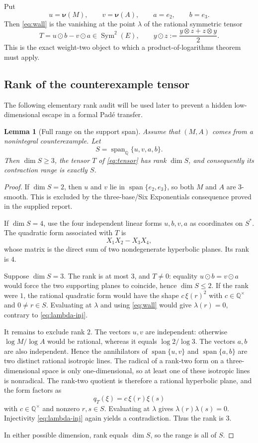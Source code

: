 \documentclass[11pt]{article}
\newtheorem{lemma}[theorem]{Lemma}
\theoremstyle{definition}
\newcommand{\Q}{\mathbb Q}
\newcommand{\Span}{\operatorname{span}}
\newcommand{\val}{\boldsymbol\nu}
\newcommand{\odotQ}{\mathbin{\odot}}
\begin{document}
Put
\[
  u=\val(M),\qquad v=\val(A),\qquad a=e_2,\qquad b=e_3.
\]
Then \eqref{eq:wall} is the vanishing at the point $\lambda$ of the rational symmetric tensor
\begin{equation}\label{eq:tensor}
  T=u\odotQ b-v\odotQ a\in\operatorname{Sym}^2(E),
  \qquad y\odotQ z:=\frac{y\otimes z+z\otimes y}{2}.
\end{equation}
This is the exact weight-two object to which a product-of-logarithms theorem must apply.

\subsection{Rank of the counterexample tensor}

The following elementary rank audit will be used later to prevent a hidden low-dimensional
escape in a formal Pad\'e transfer.

\begin{lemma}[Full range on the support span]\label{lem:tensor-rank}
Assume that $(M,A)$ comes from a nonintegral counterexample.  Let
\[
  S=\Span_\Q\{u,v,a,b\}.
\]
Then $\dim S\ge3$, the tensor $T$ of \eqref{eq:tensor} has rank $\dim S$, and consequently
its contraction range is exactly $S$.
\end{lemma}

\begin{proof}
If $\dim S=2$, then $u$ and $v$ lie in $\Span\{e_2,e_3\}$, so both $M$ and $A$ are
$3$-smooth.  This is excluded by the three-base/Six Exponentials consequence proved in the
supplied report.

If $\dim S=4$, use the four independent linear forms $u,b,v,a$ as coordinates on $S^*$.
The quadratic form associated with $T$ is
\[
  X_1X_2-X_3X_4,
\]
whose matrix is the direct sum of two nondegenerate hyperbolic planes.  Its rank is $4$.

Suppose $\dim S=3$.  The rank is at most $3$, and $T\ne0$: equality $u\odotQ b=v\odotQ a$
would force the two supporting planes to coincide, hence $\dim S\le2$.  If the rank were $1$,
the rational quadratic form would have the shape $c\,\xi(r)^2$ with $c\in\Q^\times$ and
$0\ne r\in S$.  Evaluating at $\lambda$ and using \eqref{eq:wall} would give
$\lambda(r)=0$, contrary to \eqref{eq:lambda-inj}.

It remains to exclude rank $2$.  The vectors $u,v$ are independent: otherwise
$\log M/\log A$ would be rational, whereas it equals $\log2/\log3$.  The vectors $a,b$ are
also independent.  Hence the annihilators of $\Span\{u,v\}$ and $\Span\{a,b\}$ are two
distinct rational isotropic lines.  The radical of a rank-two form on a three-dimensional
space is only one-dimensional, so at least one of these isotropic lines is nonradical.  The
rank-two quotient is therefore a rational hyperbolic plane, and the form factors as
\[
  q_T(\xi)=c\,\xi(r)\xi(s)
\]
with $c\in\Q^\times$ and nonzero $r,s\in S$.  Evaluating at $\lambda$ gives
$\lambda(r)\lambda(s)=0$.  Injectivity \eqref{eq:lambda-inj} again yields a contradiction.
Thus the rank is $3$.

In either possible dimension, rank equals $\dim S$, so the range is all of $S$.
\end{proof}
\end{document}

